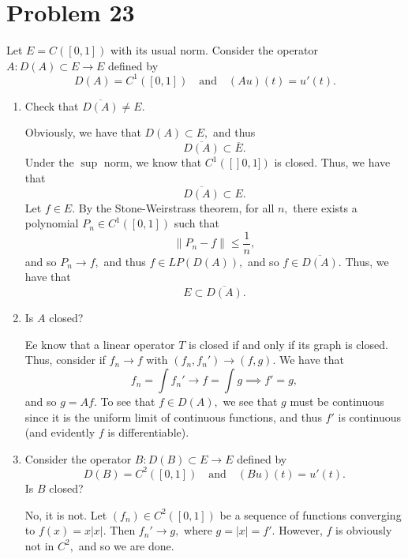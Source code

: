 \documentclass[11pt]{article}
\begin{document}
\section*{Problem 23}
\begin{problem}
    Let \( E = C([0,1]) \) with its usual norm. Consider the operator \( A : D(A) \subset E \to E \) defined by
\[
D(A) = C^1([0,1]) \quad \text{and} \quad (Au)(t) = u'(t).
\]
\begin{enumerate}
    \item Check that \( \overline{D(A)} \neq E \).
    \begin{solution}
        Obviously, we have that $D(A)\subset E,$ and thus 
        \[\overline{D(A)}\subset \overline{E}.\] Under the $\sup$ norm, we know that $C^1([]0,1])$ is closed. Thus, we have that 
        \[\overline{D(A)}\subset E.\] Let $f\in E.$ By the Stone-Weirstrass theorem, for all $n,$ there exists a polynomial $P_n \in C^1([0,1])$ such that 
        \[\|P_n - f\| \leq \frac{1}{n},\] and so $P_n \to f,$ and thus $f \in LP(D(A)),$ and so $f\in \overline{D(A)}.$ Thus, we have that 
        \[E \subset \overline{D(A)}.\] 
    \end{solution}
    \item Is \( A \) closed?
    \begin{solution}
        Ee know that a linear operator $T$ is closed if and only if its graph is closed. Thus, consider if $f_n \to f$ with $(f_n, f_n') \to (f, g).$ We have that
    \[f_n = \int f_n' \to f = \int g \implies f' = g,\] and so $g = Af.$ To see that $f\in D(A),$ we see that $g$ must be continuous since it is the uniform limit of continuous functions, and thus $f'$ is continuous (and evidently $f$ is differentiable).
    \end{solution}
    \item Consider the operator \( B : D(B) \subset E \to E \) defined by
    \[
    D(B) = C^2([0,1]) \quad \text{and} \quad (Bu)(t) = u'(t).
    \]
    Is \( B \) closed?
    \begin{solution}
        No, it is not. Let $(f_n)\in C^2([0,1])$ be a sequence of functions converging to $f(x) = x|x|.$ Then $f_n' \to g,$ where $g = |x| = f'.$ However, $f$ is obviously not in $C^2,$ and so we are done.
    \end{solution}
\end{enumerate}
\end{problem}

\newpage
\end{document}
